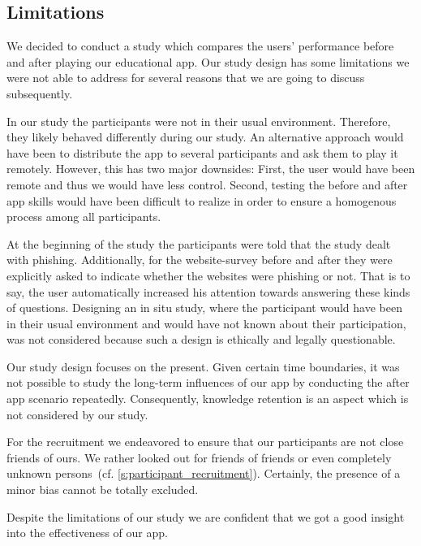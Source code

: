 \subsection{Limitations}
We decided to conduct a study which compares the users' performance before and after playing our educational app.
Our study design has some limitations we were not able to address for several reasons that we are going to discuss subsequently.

\begin{description}[leftmargin=0cm]
	\item[Behavior Change:] In our study the participants were not in their usual environment. 
	Therefore, they likely behaved differently during our study.
	An alternative approach would have been to distribute the app to several participants and ask them to play it remotely.
	However, this has two major downsides: First, the user would have been remote and thus we would have less control.
	Second, testing the before and after app skills would have been difficult to realize in order to ensure a homogenous process among all participants.
	\item[Increased Attention:] At the beginning of the study the participants were told that the study dealt with phishing.
	Additionally, for the website-survey before and after they were explicitly asked to indicate whether the websites were phishing or not.
	That is to say, the user automatically increased his attention towards answering these kinds of questions.
	Designing an in situ study, where the participant would have been in their usual environment and would have not known about their participation, was not considered because such a design is ethically and legally questionable. 
	\item[Knowledge Retention:] Our study design focuses on the present.
	Given certain time boundaries, it was not possible to study the long-term influences of our app by conducting the after app scenario repeatedly. 
	Consequently, knowledge retention is an aspect which is not considered by our study.
	\item[Bias:] For the recruitment we endeavored to ensure that our participants are not close friends of ours. 
	We rather looked out for friends of friends or even completely unknown persons~(cf. \autoref{s:participant_recruitment}).
	Certainly, the presence of a minor bias cannot be totally excluded.
\end{description}
Despite the limitations of our study we are confident that we got a good insight into the effectiveness of our app.

